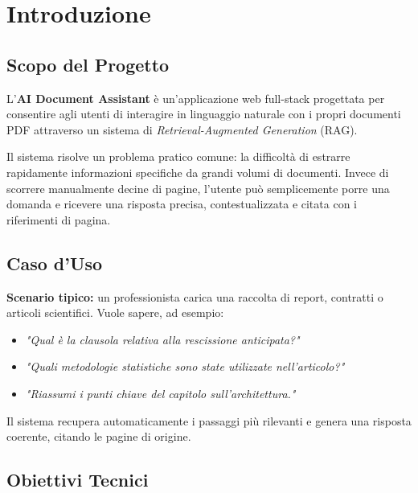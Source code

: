 \chapter{Introduzione}

\section{Scopo del Progetto}

L'\textbf{AI Document Assistant} è un'applicazione web full-stack progettata per consentire
agli utenti di interagire in linguaggio naturale con i propri documenti PDF attraverso un
sistema di \emph{Retrieval-Augmented Generation} (RAG).

Il sistema risolve un problema pratico comune: la difficoltà di estrarre rapidamente
informazioni specifiche da grandi volumi di documenti. Invece di scorrere manualmente
decine di pagine, l'utente può semplicemente porre una domanda e ricevere una risposta
precisa, contestualizzata e citata con i riferimenti di pagina.

\section{Caso d'Uso}

\textbf{Scenario tipico:} un professionista carica una raccolta di report, contratti o
articoli scientifici. Vuole sapere, ad esempio:

\begin{itemize}
  \item \emph{"Qual è la clausola relativa alla rescissione anticipata?"}
  \item \emph{"Quali metodologie statistiche sono state utilizzate nell'articolo?"}
  \item \emph{"Riassumi i punti chiave del capitolo sull'architettura."}
\end{itemize}

Il sistema recupera automaticamente i passaggi più rilevanti e genera una risposta
coerente, citando le pagine di origine.

\section{Obiettivi Tecnici}

